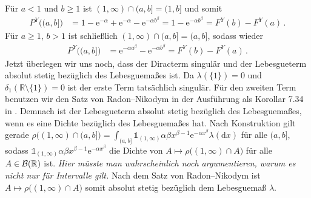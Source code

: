 \documentclass{article}
\begin{document}
Für $a<1$ und $b\geq1$ ist $(1,\infty)\cap(a,b]=(1,b]$ und somit
\begin{align*}
  P^Y\bigl((a,b]\bigr)
  &=1-\mathrm{e}^{-\alpha}+\mathrm{e}^{-\alpha}-\mathrm{e}^{-\alpha b^\beta}=1-\mathrm{e}^{-\alpha b^\beta}=F^Y(b)-F^Y(a)\,.
\end{align*}
Für $a\geq1$, $b>1$ ist schließlich $(1,\infty)\cap(a,b]=(a,b]$, sodass wieder
\begin{align*}
  P^Y\bigl((a,b]\bigr)
  &=\mathrm{e}^{-\alpha a^\beta}-\mathrm{e}^{-\alpha b^\beta}=F^Y(b)-F^Y(a)\,.
\end{align*}
Jetzt überlegen wir uns noch, dass der Diracterm singulär und der Lebesgueterm absolut stetig bezüglich des Lebesguemaßes ist.
Da $\lambda(\{1\})=0$ und $\delta_1(\mathbb{R}\setminus\{1\})=0$ ist der erste Term tatsächlich singulär.
Für den zweiten Term benutzen wir den Satz von Radon--Nikodym in der Ausführung als Korollar 7.34 in \cite{klenke}.
Demnach ist der Lebesgueterm absolut stetig bezüglich des Lebesguemaßes, wenn es eine Dichte bezüglich des Lebesguemaßes hat.
Nach Konstruktion gilt gerade $\rho\bigl((1,\infty)\cap(a,b]\bigr)=\int_{(a,b]}\mathbb{1}_{(1,\infty)}\alpha\beta x^{\beta-1}\mathrm{e}^{-\alpha x^\beta}\lambda(\mathrm{d}x)$ für alle $(a,b]$, sodass $\mathbb{1}_{(1,\infty)}\alpha\beta x^{\beta-1}\mathrm{e}^{-\alpha x^\beta}$ die Dichte von $A\mapsto\rho\bigl((1,\infty)\cap A\bigr)$ für alle $A\in{\cal B}(\mathbb{R})$ ist. \emph{Hier müsste man wahrscheinlich noch argumentieren, warum es nicht nur für Intervalle gilt.}
Nach dem Satz von Radon--Nikodym ist $A\mapsto\rho\bigl((1,\infty)\cap A\bigr)$ somit absolut stetig bezüglich dem Lebesguemaß $\lambda$.

\end{document}
